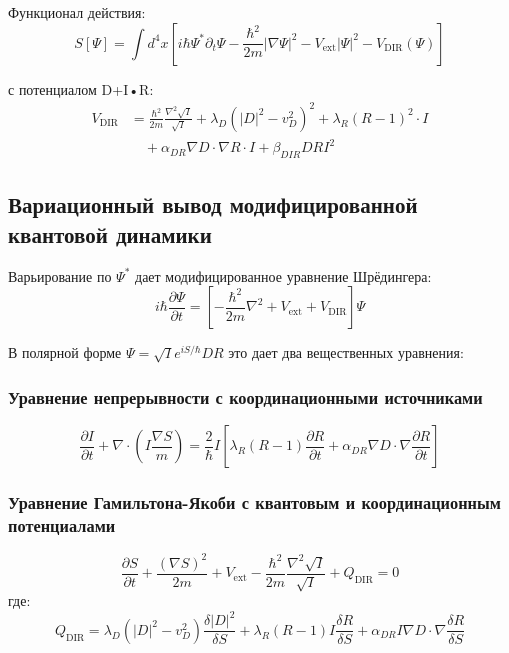\documentclass[11pt,a4paper]{article}
\begin{document}
	Функционал действия:
	\begin{equation}
		S[\Psi] = \int d^4x \left[ i\hbar \Psi^* \partial_t \Psi - \frac{\hbar^2}{2m} |\nabla \Psi|^2 - V_{\text{ext}} |\Psi|^2 - V_{\text{DIR}}(\Psi) \right]
	\end{equation}
	
	с потенциалом D+I•R:
	\begin{align}
		V_{\text{DIR}} &= \frac{\hbar^2}{2m} \frac{\nabla^2 \sqrt{I}}{\sqrt{I}} 
		+ \lambda_D (|D|^2 - v_D^2)^2 
		+ \lambda_R (R - 1)^2 \cdot I \\
		&\quad + \alpha_{DR} \nabla D \cdot \nabla R \cdot I 
		+ \beta_{DIR} D R I^2
	\end{align}
	
	\subsection{Вариационный вывод модифицированной квантовой динамики}
	
	Варьирование по $\Psi^*$ дает модифицированное уравнение Шрёдингера:
	\begin{equation}
		i\hbar \frac{\partial \Psi}{\partial t} = \left[ -\frac{\hbar^2}{2m} \nabla^2 + V_{\text{ext}} + V_{\text{DIR}} \right] \Psi
	\end{equation}
	
	В полярной форме $\Psi = \sqrt{I} e^{iS/\hbar} D R$ это дает два вещественных уравнения:
	
	\subsubsection{Уравнение непрерывности с координационными источниками}
	\begin{equation}
		\frac{\partial I}{\partial t} + \nabla \cdot \left( I \frac{\nabla S}{m} \right) = \frac{2}{\hbar} I \left[ \lambda_R (R-1) \frac{\partial R}{\partial t} + \alpha_{DR} \nabla D \cdot \nabla \frac{\partial R}{\partial t} \right]
	\end{equation}
	
	\subsubsection{Уравнение Гамильтона-Якоби с квантовым и координационным потенциалами}
	\begin{equation}
		\frac{\partial S}{\partial t} + \frac{(\nabla S)^2}{2m} + V_{\text{ext}} - \frac{\hbar^2}{2m} \frac{\nabla^2 \sqrt{I}}{\sqrt{I}} + Q_{\text{DIR}} = 0
	\end{equation}
	где:
	\begin{equation}
		Q_{\text{DIR}} = \lambda_D (|D|^2 - v_D^2) \frac{\delta |D|^2}{\delta S} 
		+ \lambda_R (R-1) I \frac{\delta R}{\delta S}
		+ \alpha_{DR} I \nabla D \cdot \nabla \frac{\delta R}{\delta S}
	\end{equation}
	
\end{document}

